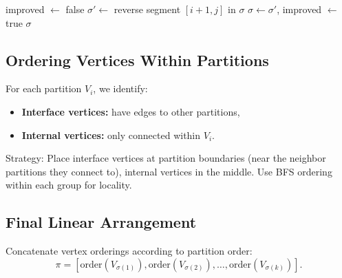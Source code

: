 \documentclass[11pt,a4paper]{article}
\theoremstyle{definition}
\theoremstyle{plain}
\theoremstyle{remark}
\begin{document}
\begin{algorithm}[H]
\caption{2-opt Improvement for Partition Ordering}
\begin{algorithmic}[1]
  \Repeat
    \State improved $\gets$ false
        \State $\sigma' \gets$ reverse segment $[i+1, j]$ in $\sigma$
          \State $\sigma \gets \sigma'$, improved $\gets$ true
        \EndIf
      \EndFor
    \EndFor
  \State \Return $\sigma$
\EndProcedure
\end{algorithmic}
\end{algorithm}

\subsection{Ordering Vertices Within Partitions}

For each partition $V_i$, we identify:
\begin{itemize}
  \item \textbf{Interface vertices:} have edges to other partitions,
  \item \textbf{Internal vertices:} only connected within $V_i$.
\end{itemize}

Strategy: Place interface vertices at partition boundaries (near the
neighbor partitions they connect to), internal vertices in the middle.
Use BFS ordering within each group for locality.

\subsection{Final Linear Arrangement}

Concatenate vertex orderings according to partition order:
\[
  \pi = [\text{order}(V_{\sigma(1)}), \text{order}(V_{\sigma(2)}), \ldots,
         \text{order}(V_{\sigma(k)})].
\]
\end{document}
